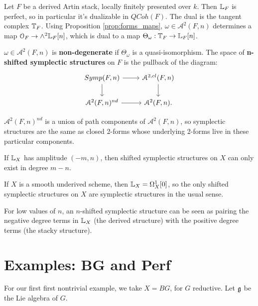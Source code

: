 Let $F$ be a derived Artin stack, locally finitely presented over $k$. Then $\mathbb L_F$ is perfect, so in particular it's
dualizable in $QCoh(F)$. The dual is the tangent complex $\mathbb T_F$.
Using Proposition \ref{prop:forms_maps}, $\omega \in \mathcal{A}^2(F,n)$ determines a map $\mathcal{O}_F \to
\wedge^2 \mathbb L_F[n]$, which is dual to a map $ \Theta_{\omega}: \mathbb T_F \to \mathbb L_F[n]$.

\begin{defin}
$\omega \in \mathcal{A}^2(F,n)$ is \textbf{non-degenerate} if $\Theta_{\omega}$ is a quasi-isomorphism. The space of
\textbf{n-shifted symplectic structures} on $F$ is the pullback of the diagram:
\[
\begin{tikzcd}
Symp(F,n)\arrow{d}\arrow{r} & \mathcal{A}^{2,cl}(F,n)\arrow{d} \\
\mathcal{A}^2(F,n)^{nd}\arrow{r} & \mathcal{A}^2(F,n).
\end{tikzcd}
\]
\end{defin}

\begin{rem}
$\mathcal{A}^2(F,n)^{nd}$ is a union of path components of $\mathcal{A}^2(F,n)$, so symplectic structures are the same as
closed 2-forms whose underlying 2-forms live in these particular components.
\end{rem}

\begin{rem}
If $\mathbb L_X$ has amplitude $(-m,n)$, then shifted symplectic structures on $X$ can only exist in degree $m-n$.
\end{rem}

\begin{eg}
If $X$ is a smooth underived scheme, then $\mathbb L_X = \Omega^1_X[0]$, so the only shifted symplectic structures on $X$
are symplectic structures in the usual sense.
\end{eg}

\begin{rem}
For low values of $n$, an $n$-shifted symplectic structure can be seen as pairing the negative degree terms in $\mathbb L_X$
(the derived structure) with the positive degree terms (the stacky structure).
\end{rem}


\section{Examples: BG and Perf}
For our first first nontrivial example, we take $X = BG$, for $G$ reductive. Let $\mathfrak g$ be the Lie algebra of $G$.

